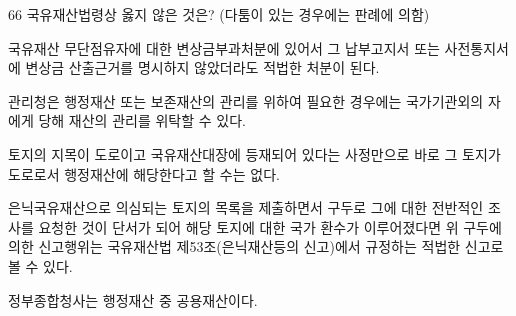 \begin{question}{66}
국유재산법령상 옳지 않은 것은? (다툼이 있는 경우에는 판례에 의함)
\begin{choices}
  \item 국유재산 무단점유자에 대한 변상금부과처분에 있어서 그 납부고지서 또는 사전통지서에 변상금 산출근거를 명시하지 않았더라도 적법한 처분이 된다.
  \item 관리청은 행정재산 또는 보존재산의 관리를 위하여 필요한 경우에는 국가기관외의 자에게 당해 재산의 관리를 위탁할 수 있다.
  \item 토지의 지목이 도로이고 국유재산대장에 등재되어 있다는 사정만으로 바로 그 토지가 도로로서 행정재산에 해당한다고 할 수는 없다.
  \item 은닉국유재산으로 의심되는 토지의 목록을 제출하면서 구두로 그에 대한 전반적인 조사를 요청한 것이 단서가 되어 해당 토지에 대한 국가 환수가 이루어졌다면 위 구두에 의한 신고행위는 국유재산법 제53조(은닉재산등의 신고)에서 규정하는 적법한 신고로 볼 수 있다.
  \item 정부종합청사는 행정재산 중 공용재산이다.
\end{choices}
\end{question}
